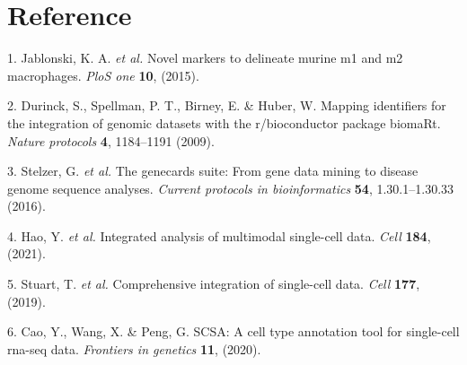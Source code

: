 \documentclass[
]{article}
\newenvironment{cslreferences}%
  {}%
  {\par}
\begin{document}
\hypertarget{bibliography}{%
\section*{Reference}\label{bibliography}}

\hypertarget{refs}{}
\begin{cslreferences}
\leavevmode\hypertarget{ref-NovelMarkersTJablon2015}{}%
1. Jablonski, K. A. \emph{et al.} Novel markers to delineate murine m1 and m2 macrophages. \emph{PloS one} \textbf{10}, (2015).

\leavevmode\hypertarget{ref-MappingIdentifDurinc2009}{}%
2. Durinck, S., Spellman, P. T., Birney, E. \& Huber, W. Mapping identifiers for the integration of genomic datasets with the r/bioconductor package biomaRt. \emph{Nature protocols} \textbf{4}, 1184--1191 (2009).

\leavevmode\hypertarget{ref-TheGenecardsSStelze2016}{}%
3. Stelzer, G. \emph{et al.} The genecards suite: From gene data mining to disease genome sequence analyses. \emph{Current protocols in bioinformatics} \textbf{54}, 1.30.1--1.30.33 (2016).

\leavevmode\hypertarget{ref-IntegratedAnalHaoY2021}{}%
4. Hao, Y. \emph{et al.} Integrated analysis of multimodal single-cell data. \emph{Cell} \textbf{184}, (2021).

\leavevmode\hypertarget{ref-ComprehensiveIStuart2019}{}%
5. Stuart, T. \emph{et al.} Comprehensive integration of single-cell data. \emph{Cell} \textbf{177}, (2019).

\leavevmode\hypertarget{ref-ScsaACellTyCaoY2020}{}%
6. Cao, Y., Wang, X. \& Peng, G. SCSA: A cell type annotation tool for single-cell rna-seq data. \emph{Frontiers in genetics} \textbf{11}, (2020).
\end{cslreferences}
\end{document}
